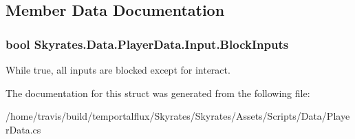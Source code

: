 \subsection{Member Data Documentation}
\hypertarget{struct_skyrates_1_1_data_1_1_player_data_1_1_input_a2bdc93fb39026f0e848d02f5e4a7880c}{
\subsubsection[{Block\-Inputs}]{\setlength{\rightskip}{0pt plus 5cm}bool Skyrates.\-Data.\-Player\-Data.\-Input.\-Block\-Inputs}}\label{struct_skyrates_1_1_data_1_1_player_data_1_1_input_a2bdc93fb39026f0e848d02f5e4a7880c}


While true, all inputs are blocked except for interact. 



The documentation for this struct was generated from the following file\-:\begin{DoxyCompactItemize}
\item 
/home/travis/build/temportalflux/\-Skyrates/\-Skyrates/\-Assets/\-Scripts/\-Data/Player\-Data.\-cs\end{DoxyCompactItemize}
